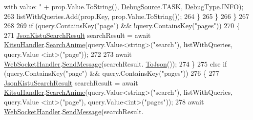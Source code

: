 \begin{DoxyCode}
{       with value: "} + prop.Value.ToString(), \mbox{\hyperlink{namespace_little_weeb_library_1_1_handlers_a2a6ca0775121c9c503d58aa254d292be}{DebugSource}}.TASK, \mbox{\hyperlink{namespace_little_weeb_library_1_1_handlers_ab66019ed40462876ec4e61bb3ccb0a62}{DebugType}}.INFO);
263                         listWithQueries.Add(prop.Key, prop.Value.ToString());
264                     \}
265                 \}
266             \}
267 
268 
269             \textcolor{keywordflow}{if} (query.ContainsKey(\textcolor{stringliteral}{"page"}) && !query.ContainsKey(\textcolor{stringliteral}{"pages"}))
270             \{
271                 \mbox{\hyperlink{class_little_weeb_library_1_1_models_1_1_json_kistu_search_result}{JsonKistuSearchResult}} searchResult = await 
      \mbox{\hyperlink{class_little_weeb_library_1_1_handlers_1_1_kitsu_handler}{KitsuHandler}}.\mbox{\hyperlink{class_little_weeb_library_1_1_handlers_1_1_kitsu_handler_a92f121e8fec8cce5ffe0454d3a17c156}{SearchAnime}}(query.Value<\textcolor{keywordtype}{string}>(\textcolor{stringliteral}{"search"}), listWithQueries, query.Value
      <\textcolor{keywordtype}{int}>(\textcolor{stringliteral}{"page"}));
272 
273                 await \mbox{\hyperlink{class_little_weeb_library_1_1_handlers_1_1_web_socket_handler}{WebSocketHandler}}.\mbox{\hyperlink{class_little_weeb_library_1_1_handlers_1_1_web_socket_handler_a1de289d54d665a32c93478c68d3e6ad0}{SendMessage}}(searchResult.
      \mbox{\hyperlink{class_little_weeb_library_1_1_models_1_1_json_kistu_search_result_a6adca32faf08b7fb63c9f469ab3fbcae}{ToJson}}());
274             \}
275             \textcolor{keywordflow}{else} \textcolor{keywordflow}{if} (query.ContainsKey(\textcolor{stringliteral}{"page"}) && query.ContainsKey(\textcolor{stringliteral}{"pages"}))
276             \{
277                 \mbox{\hyperlink{class_little_weeb_library_1_1_models_1_1_json_kistu_search_result}{JsonKistuSearchResult}} searchResult = await 
      \mbox{\hyperlink{class_little_weeb_library_1_1_handlers_1_1_kitsu_handler}{KitsuHandler}}.\mbox{\hyperlink{class_little_weeb_library_1_1_handlers_1_1_kitsu_handler_a92f121e8fec8cce5ffe0454d3a17c156}{SearchAnime}}(query.Value<\textcolor{keywordtype}{string}>(\textcolor{stringliteral}{"search"}), listWithQueries, query.Value
      <\textcolor{keywordtype}{int}>(\textcolor{stringliteral}{"page"}), query.Value<\textcolor{keywordtype}{int}>(\textcolor{stringliteral}{"pages"}));
278                 await \mbox{\hyperlink{class_little_weeb_library_1_1_handlers_1_1_web_socket_handler}{WebSocketHandler}}.\mbox{\hyperlink{class_little_weeb_library_1_1_handlers_1_1_web_socket_handler_a1de289d54d665a32c93478c68d3e6ad0}{SendMessage}}(searchResult.

\end{DoxyCode}
